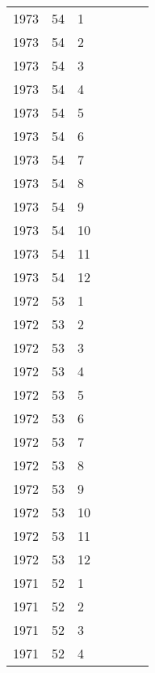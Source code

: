 \begin{longtable}{ |l|l|l|l|p{2.7cm}|l|p{2cm}| }
 1973 & 54 &     1 &         &                &  & \\
 1973 & 54 &     2 &         &                &  & \\
 1973 & 54 &     3 &         &                &  & \\
 1973 & 54 &     4 &         &                &  & \\
 1973 & 54 &     5 &         &                &  & \\
 1973 & 54 &     6 &         &                &  & \\
 1973 & 54 &     7 &         &                &  & \\
 1973 & 54 &     8 &         &                &  & \\
 1973 & 54 &     9 &         &                &  & \\
 1973 & 54 &    10 &         &                &  & \\
 1973 & 54 &    11 &         &                &  & \\
 1973 & 54 &    12 &         &                &  & \\
 1972 & 53 &     1 &         &                &  & \\
 1972 & 53 &     2 &         &                &  & \\
 1972 & 53 &     3 &         &                &  & \\
 1972 & 53 &     4 &         &                &  & \\
 1972 & 53 &     5 &         &                &  & \\
 1972 & 53 &     6 &         &                &  & \\
 1972 & 53 &     7 &         &                &  & \\
 1972 & 53 &     8 &         &                &  & \\
 1972 & 53 &     9 &         &                &  & \\
 1972 & 53 &    10 &         &                &  & \\
 1972 & 53 &    11 &         &                &  & \\
 1972 & 53 &    12 &         &                &  & \\
 1971 & 52 &     1 &         &                &  & \\
 1971 & 52 &     2 &         &                &  & \\
 1971 & 52 &     3 &         &                &  & \\
 1971 & 52 &     4 &         &                &  & \\

\end{longtable}
